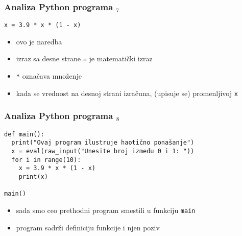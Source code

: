 \documentclass[utf8,compress]{beamer}
\begin{document}
\begin{frame}[fragile]
\frametitle{Analiza Python programa $_7$}
\begin{verbatim}
x = 3.9 * x * (1 - x)
\end{verbatim}
\begin{itemize}
  \item ovo je naredba 
  \item izraz sa desne strane \texttt{=} je matematički izraz
  \item \texttt{*} označava množenje
  \item kada se vrednost na desnoj strani izračuna,  (upisuje se) promenljivoj \texttt{x} 
\end{itemize}
\end{frame}

\begin{frame}[fragile]
\frametitle{Analiza Python programa $_8$}
\begin{verbatim}
def main():
  print("Ovaj program ilustruje haotično ponašanje")
  x = eval(raw_input("Unesite broj između 0 i 1: "))
  for i in range(10):
    x = 3.9 * x * (1 - x)
    print(x)

main()
\end{verbatim}
\begin{itemize}
  \item sada smo ceo prethodni program smestili u funkciju \texttt{main}
  \item program sadrži definiciju funkcije i njen poziv
\end{itemize}
\end{frame}
\end{document}

